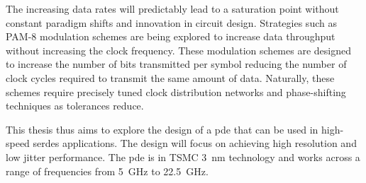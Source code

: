 The increasing data rates will predictably lead to a saturation point without constant paradigm shifts and innovation in circuit design. Strategies such as PAM-8 modulation schemes are being explored to increase data throughput without increasing the clock frequency. These modulation schemes are designed to increase the number of bits transmitted per symbol reducing the number of clock cycles required to transmit the same amount of data. Naturally, these schemes require precisely tuned clock distribution networks and phase-shifting techniques as tolerances reduce.

This thesis thus aims to explore the design of a \gls{pde} that can be used in high-speed \gls{serdes} applications. The design will focus on achieving high resolution and low jitter performance. The \gls{pde} is in TSMC 3~nm technology and works across a range of frequencies from 5~GHz to 22.5~GHz.
